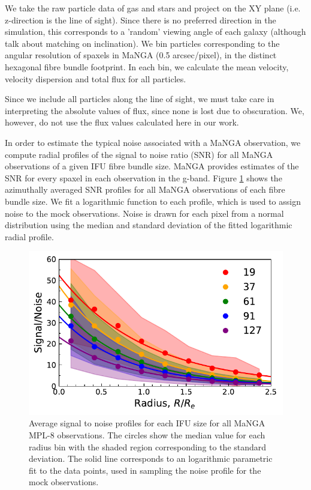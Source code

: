 \documentclass[fleqn,usenatbib]{mnras}
\begin{document}
We take the raw particle data of gas and stars and project on the XY plane (i.e. z-direction is the line of sight). Since there is no preferred direction in the simulation, this corresponds to a 'random' viewing angle of each galaxy (although talk about matching on inclination). We bin particles corresponding to the angular resolution of spaxels in MaNGA (0.5 arcsec/pixel), in the distinct hexagonal fibre bundle footprint. In each bin, we calculate the mean velocity, velocity dispersion and total flux for all particles.

Since we include all particles along the line of sight, we must take care in interpreting the absolute values of flux, since none is lost due to obscuration. We, however, do not use the flux values calculated here in our work.

In order to estimate the typical noise associated with a MaNGA observation, we compute radial profiles of the signal to noise ratio (SNR) for all MaNGA observations of a given IFU fibre bundle size. MaNGA provides estimates of the SNR for every spaxel in each observation in the g-band. Figure \ref{fig:noise_profile} shows the azimuthally averaged SNR profiles for all MaNGA observations of each fibre bundle size. We fit a logarithmic function to each profile, which is used to assign noise to the mock observations. Noise is drawn for each pixel from a normal distribution using the median and standard deviation of the fitted logarithmic radial profile.   

\begin{figure}
	\includegraphics[width=\linewidth]{noise_profiles_ifusize.pdf}
    \caption{Average signal to noise profiles for each IFU size for all MaNGA MPL-8 observations. The circles show the median value for each radius bin with the shaded region corresponding to the standard deviation. The solid line corresponds to an logarithmic parametric fit to the data points, used in sampling the noise profile for the mock observations.}
    \label{fig:noise_profile}
\end{figure}
\end{document}
